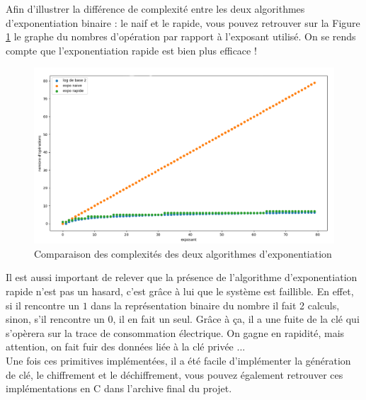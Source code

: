 Afin d'illustrer la différence de complexité entre les deux algorithmes d'exponentiation binaire : le naif et le rapide, vous pouvez retrouver sur la Figure \ref{fig:diff_complexite} le graphe du nombres d'opération par rapport à l'exposant utilisé. On se rends compte que l'exponentiation rapide est bien plus efficace !
\begin{figure}[H]
    \centering
    \includegraphics[width=\textwidth]{fig/diff_complexite.png}
    \caption{Comparaison des complexités des deux algorithmes d'exponentiation}
    \label{fig:diff_complexite}
\end{figure}
Il est aussi important de relever que la présence de l'algorithme d’exponentiation rapide n'est pas un hasard, c'est grâce à lui que le système est faillible. En effet, si il rencontre un $1$ dans la représentation binaire du nombre il fait 2 calculs, sinon, s'il rencontre un $0$, il en fait un seul. Grâce à ça, il a une fuite de la clé qui s’opèrera sur la trace de consommation électrique. On gagne en rapidité, mais attention, on fait fuir des données liée à la clé privée ...\\

Une fois ces primitives implémentées, il a été facile d'implémenter la génération de clé, le chiffrement et le déchiffrement, vous pouvez également retrouver ces implémentations en C dans l'archive final du projet.


